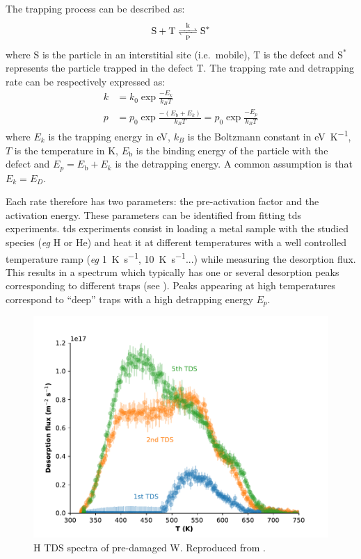 The \gls{trapping} process can be described as:
\begin{equation}
    \ce{S + T <=>[k][p] S^*}
\end{equation}
where S is the particle in an interstitial site (i.e.\ mobile), T is the defect and S$^*$ represents the particle trapped in the defect T.
The \gls{trapping} rate and \gls{detrapping} rate can be respectively expressed as:
\begin{align}
    k &= k_0 \exp{\frac{-E_k}{k_B T}} \\
    p &= p_0 \exp{\frac{-(E_\mathrm{b} + E_k)}{k_B T}} = p_0 \exp{\frac{-E_p}{k_B T}}
\end{align}
where $E_k$ is the \gls{trapping} energy in \si{eV}, $k_B$ is the Boltzmann constant in \si{eV.K^{-1}}, $T$ is the temperature in \si{K}, $E_\mathrm{b}$ is the binding energy of the particle with the defect and $E_p = E_\mathrm{b} + E_k$ is the \gls{detrapping} energy.
A common assumption is that $E_k = E_D$.

Each rate therefore has two parameters: the pre-activation factor and the activation energy.
These parameters can be identified from fitting \gls{tds} experiments.
\gls{tds} experiments consist in loading a metal sample with the studied species (\textit{eg} \gls{H} or \gls{He}) and heat it at different temperatures with a well controlled temperature ramp (\textit{eg} \SI{1}{K.s^{-1}}, \SI{10}{K.s^{-1}}...) while measuring the desorption flux.
This results in a spectrum which typically has one or several desorption peaks corresponding to different traps (see ).
Peaks appearing at high temperatures correspond to ``deep'' traps with a high \gls{detrapping} energy $E_p$.

\begin{figure} [h!]
    \centering
    \includegraphics[width=\linewidth]{Figures/Chapter1/tds_helium_nicolas.pdf}
    \caption{H TDS spectra of pre-damaged W. Reproduced from \cite{ialovega_hydrogen_2020}.}
\end{figure}

